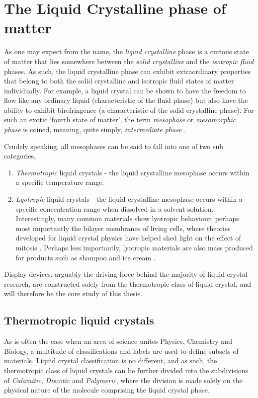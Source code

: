 \section{The Liquid Crystalline phase of matter} 

As one may expect from the name, the \textit{liquid crystalline} phase is a curious state of matter that lies somewhere between the \textit{solid crystalline} and the \textit{isotropic fluid} phases. As such, the liquid crystalline phase can exhibit extraordinary properties that belong to both the solid crystalline and isotropic fluid states of matter individually. For example, a liquid crystal can be shown to have the freedom to flow like any ordinary liquid (characteristic of the fluid phase) but also have the ability to exhibit birefringence (a characteristic of the solid crystalline phase). For such an exotic `fourth state of matter', the term \textit{mesophase} or \textit{mesomorphic phase} is coined, meaning, quite simply, \textit{intermediate phase} \citep{Vertogen1988}. 

Crudely speaking, all mesophases can be said to fall into one of two sub categories,

\begin{enumerate}
	\item \textit{Thermotropic} liquid crystals - the liquid crystalline mesophase occurs within a specific temperature range.
	\item \textit{Lyotropic} liquid crystals - the liquid crystalline mesophase occurs within a specific concentration range when dissolved in a solvent solution. Interestingly, many common materials show lyotropic behaviour, perhaps most importantly the bilayer membranes of living cells, where theories developed for liquid crystal physics have helped shed light on the effect of mitosis \citep{Lydon2006}. Perhaps less importantly, lyotropic materials are also mass produced for products such as shampoo and ice cream \cite{Taphouse2007}.
\end{enumerate}

Display devices, arguably the driving force behind the majority of liquid crystal research, are constructed solely from the thermotropic class of liquid crystal, and will therefore be the core study of this thesis.

\subsection{Thermotropic liquid crystals}
\label{sec:Thermotropic_liquid_crystals}
As is often the case when an area of science unites Physics, Chemistry and Biology, a multitude of classifications and labels are used to define subsets of materials. Liquid crystal classification is no different, and as such, the thermotropic class of liquid crystals can be further divided into the subdivisions of \textit{Calamitic}, \textit{Discotic} and \textit{Polymeric}, where the division is made solely on the physical nature of the molecule comprising the liquid crystal phase.

